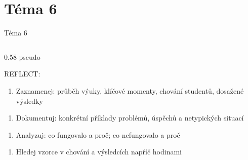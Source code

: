 \documentclass[aspectratio=169]{beamer}
\begin{document}
\section{Téma 6}
\begin{frame}{Téma 6}
\begin{columns}[T,onlytextwidth]
\begin{column}{0.58\textwidth}
\scriptsize
pseudo


REFLECT:


\begin{enumerate}

\def\labelenumi{\arabic{enumi}.}

\tightlist

\item

  Zaznamenej: průběh výuky, klíčové momenty, chování studentů, dosažené výsledky

\end{enumerate}


\begin{enumerate}

\def\labelenumi{\arabic{enumi}.}

\setcounter{enumi}{1}

\tightlist

\item

  Dokumentuj: konkrétní příklady problémů, úspěchů a netypických situací

\end{enumerate}


\begin{enumerate}

\def\labelenumi{\arabic{enumi}.}

\setcounter{enumi}{2}

\tightlist

\item

  Analyzuj: co fungovalo a proč; co nefungovalo a proč

\end{enumerate}


\begin{enumerate}

\def\labelenumi{\arabic{enumi}.}

\setcounter{enumi}{3}

\tightlist

\item

  Hledej vzorce v chování a výsledcích napříč hodinami


\end{enumerate}
\end{column}
\end{columns}
\end{frame}
\end{document}
